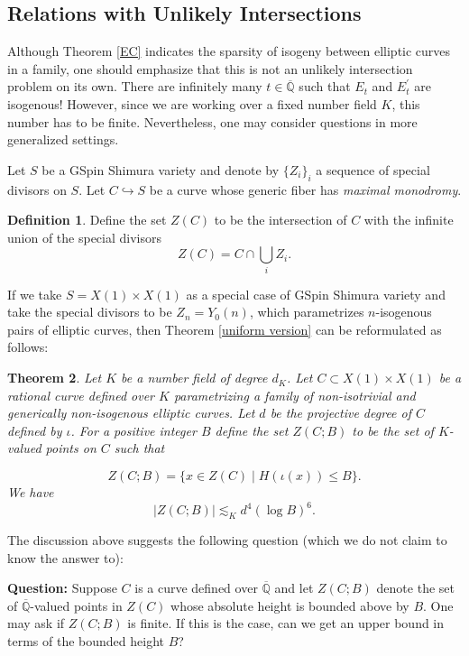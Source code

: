 \documentclass[12pt]{amsart}
\newtheorem{thm}{Theorem}[section]
\theoremstyle{definition}
\newtheorem{defn}[thm]{Definition}
\theoremstyle{remark}
\numberwithin{equation}{section}
\newcommand{\Q}{\mathbb{Q}}
\begin{document}
\subsection*{Relations with Unlikely Intersections}
Although Theorem \ref{EC} indicates the sparsity of isogeny between elliptic curves in a family, one should emphasize that this is not an unlikely intersection problem on its own. There are infinitely many $t \in \overline{\Q}$ such that $E_{t}$ and $E^{\prime}_{t}$ are isogenous! However, since we are working over a fixed number field $K$, this number has to be finite. Nevertheless, one may consider questions in more generalized settings.

 Let $S$ be a GSpin Shimura variety and denote by $\{Z_{i}\}_{i}$ a sequence of special divisors on $S$. Let $C \hookrightarrow S$ be a curve whose generic fiber has \textit{maximal monodromy}. 
 
 \begin{defn}
 Define the set $Z(C)$ to be the intersection of $C$ with the infinite union of the special divisors
 $$Z(C)=C \cap \bigcup_{i} Z_{i}.$$ 
 \end{defn}

 
 If we take $S=X(1) \times X(1)$ as a special case of GSpin Shimura variety and take the special divisors to be $Z_{n}=Y_{0}(n)$, which parametrizes $n$-isogenous pairs of elliptic curves, then Theorem \ref{uniform version} can be reformulated as follows:
 
 \begin{thm}
 	Let $K$ be a number field of degree $d_K$. Let $C \subset  X(1) \times X(1)$ be a rational curve defined over $K$ parametrizing a family of non-isotrivial and generically non-isogenous elliptic curves. Let $d$ be the projective degree of $C$ defined by $\iota$. For a positive integer $B$ define the set $Z(C;B)$ to be the set of $K$-valued points on $C$ such that
 
 $$Z(C;B)=\{x \in Z(C) \mid H(\iota(x)) \le B\}.$$   
 We have $$|Z(C;B)| \lesssim_{K} d^{4}(\log B)^{6}.$$
 \end{thm}

\vspace{1em}
The discussion above suggests the following question (which we do not claim to know the answer to):
 
 \vspace{1em}
 
 \noindent \textbf{Question:} Suppose $C$ is a curve defined over $\overline{\Q}$ and let $Z(C;B)$ denote the set of $\overline{\Q}$-valued points in $Z(C)$ whose absolute height is bounded above by $B$. 
 One may ask if $Z(C;B)$ is finite. If this is the case, can we get an upper bound in terms of the bounded height $B$?
 
\end{document}
